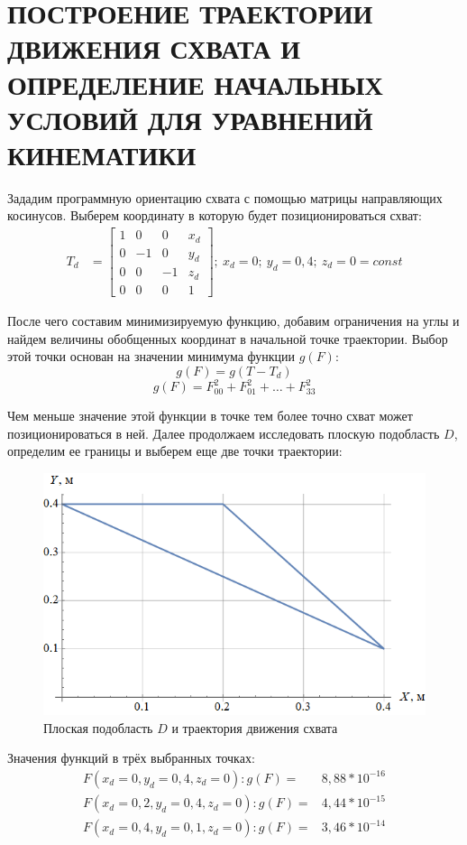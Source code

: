 \chapter{\MakeUppercase{Построение траектории движения схвата и определение начальных условий для уравнений кинематики}}
Зададим программную ориентацию схвата с помощью матрицы направляющих косинусов. Выберем координату в которую будет позиционироваться схват:
\begin{align*}
    T_d &=\begin{bmatrix}
    1 &  0 &  0 & x_d \\
    0 & -1 &  0 & y_d \\
    0 &  0 & -1 & z_d \\
    0 &  0 &  0 & 1
    \end{bmatrix}; \:
    x_d = 0; \:
    y_d = 0,4; \:
    z_d = 0 = const
\end{align*}

\noindent После чего составим минимизируемую функцию, добавим ограничения на углы и найдем величины обобщенных координат в начальной точке траектории. Выбор этой точки основан на значении минимума функции $ g(F) $:
$$ g(F) = g(T - T_d) $$
$$ g(F) = F_{00}^2 + F_{01}^2 + \hdots + F_{33}^2 $$

\noindent Чем меньше значение этой функции в точке тем более точно схват может позиционироваться в ней. Далее продолжаем исследовать плоскую подобласть $ D $, определим ее границы и выберем еще две точки траектории:

\begin{figure}[ht]
    \centering
    \includegraphics[scale=0.65]{plot_part3.png}
    \caption{Плоская подобласть $ D $ и траектория движения схвата}
\end{figure}
\newpage

\noindent Значения функций в трёх выбранных точках:
\begin{align*}
    F(x_d=0 , y_d=0,4 , z_d=0): g(F)=& 8,88*10^{-16} \\
    F(x_d=0,2 , y_d=0,4 , z_d=0): g(F)=& 4,44*10^{-15} \\
    F(x_d=0,4 , y_d=0,1 , z_d=0): g(F)=& 3,46*10^{-14}
\end{align*}




